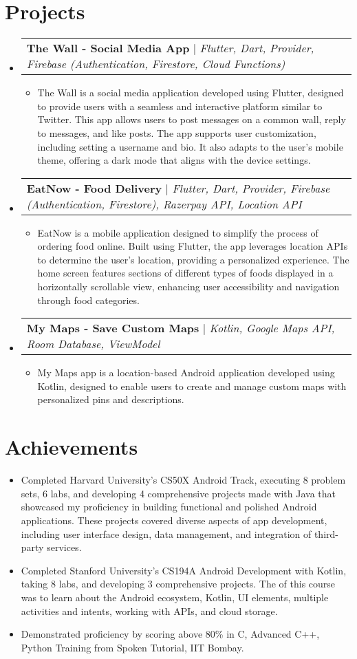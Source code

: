 \documentclass[letterpaper,11pt]{article}
\makeatletter
\newcommand{\resumeItem}[1]{
  \item\small{
    {#1 \vspace{-2pt}}
  }
}
\newcommand{\resumeProjectHeading}[2]{
    \item
    \begin{tabular*}{0.97\textwidth}{l@{\extracolsep{\fill}}r}
      \small#1 & #2 \\
    \end{tabular*}\vspace{-7pt}
}
\newcommand{\resumeSubHeadingListStart}{\begin{itemize}[leftmargin=0.15in, label={}]}
\newcommand{\resumeSubHeadingListEnd}{\end{itemize}}
\newcommand{\resumeItemListStart}{\begin{itemize}}
\newcommand{\resumeItemListEnd}{\end{itemize}\vspace{-5pt}}
\makeatother
\begin{document}
\section{Projects}
    \resumeSubHeadingListStart
      \resumeProjectHeading
          {\textbf{The Wall - Social Media App} $|$ \emph{Flutter, Dart, Provider, Firebase (Authentication, Firestore, Cloud Functions)}}{}
          \resumeItemListStart
            \resumeItem{The Wall is a social media application developed using Flutter, designed to provide users with a seamless and interactive platform similar to Twitter. This app allows users to post messages on a common wall, reply to messages, and like posts. The app supports user customization, including setting a username and bio. It also adapts to the user's mobile theme, offering a dark mode that aligns with the device settings.}
          \resumeItemListEnd
      \resumeProjectHeading
          {\textbf{EatNow - Food Delivery} $|$ \emph{Flutter, Dart, Provider, Firebase (Authentication, Firestore), Razerpay API, Location API}}{}
          \resumeItemListStart
            \resumeItem{EatNow is a mobile application designed to simplify the process of ordering food online. Built using Flutter, the app leverages location APIs to determine the user's location, providing a personalized experience. The home screen features sections of different types of foods displayed in a horizontally scrollable view, enhancing user accessibility and navigation through food categories.}
          \resumeItemListEnd
     \resumeProjectHeading
          {\textbf{My Maps - Save Custom Maps} $|$ \emph{Kotlin, Google Maps API, Room Database, ViewModel}}{}
          \resumeItemListStart
            \resumeItem{My Maps app is a location-based Android application developed using Kotlin, designed to enable users to create and manage custom maps with personalized pins and descriptions.}
          \resumeItemListEnd
    \resumeSubHeadingListEnd
%

\section{Achievements}
\resumeItemListStart
            \resumeItem{Completed Harvard University's CS50X Android Track, executing 8 problem sets, 6 labs, and developing 4 comprehensive projects made with Java that showcased my proficiency in building functional and polished Android applications. These projects covered diverse aspects of app development, including user interface design, data management, and integration of third-party services.}
            \resumeItem{Completed Stanford University's CS194A Android Development with Kotlin, taking 8 labs, and developing 3 comprehensive projects. The of this course was to learn about the Android ecosystem, Kotlin, UI elements, multiple activities and intents, working with APIs, and cloud storage.}
            \resumeItem{Demonstrated proficiency by scoring above 80\% in C, Advanced C++, Python Training from Spoken Tutorial, IIT Bombay.}
        \resumeItemListEnd
%


\end{document}
